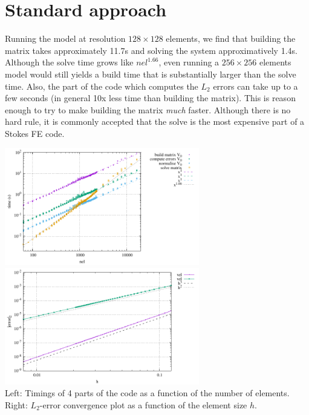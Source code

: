 \section*{Standard approach}

Running the model at resolution $128 \times 128$ elements, we find that building 
the matrix takes approximately 11.7s and solving the system approximatively 1.4s.  
Although the solve time grows like $nel^{1.66}$, even running a $256\times 256$ elements model 
would still yields a build time that is substantially larger than the solve time.
Also, the part of the code which computes the $L_2$ errors can take up to a 
few seconds (in general 10x less time than building the matrix).
This is reason enough to try to make building the matrix {\it much} faster.
Although there is no hard rule, it is commonly accepted that the solve is the 
most expensive part of a Stokes FE code.

\begin{center}
\includegraphics[width=8.5cm]{python_codes/fieldstone_150/results/times_V0}
\includegraphics[width=8.5cm]{python_codes/fieldstone_150/results/errors_V0}\\
{\captionfont 
Left: Timings of 4 parts of the code as a function of the number of elements.
Right: $L_2$-error convergence plot as a function of the element size $h$.
}
\end{center}



